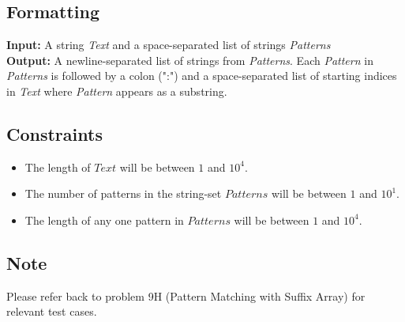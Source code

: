 \documentclass{article}
\begin{document}
\subsection*{Formatting}
\textbf{Input:} A string \emph{Text} and a space-separated list of strings \emph{Patterns}\\
\noindent\textbf{Output:} A newline-separated list of strings from \emph{Patterns}. Each \emph{Pattern} in \emph{Patterns} is followed by a colon (":") and a space-separated list of starting indices in \emph{Text} where \emph{Pattern} appears as a substring.

\subsection*{Constraints}
\begin{itemize}
    \item The length of $Text$ will be between $1$ and $10^4$.
    \item The number of patterns in the string-set $Patterns$ will be between $1$ and $10^1$.
    \item The length of any one pattern in $Patterns$ will be between $1$ and $10^4$.
\end{itemize}

\subsection*{Note}
Please refer back to problem 9H (Pattern Matching with Suffix Array) for relevant test cases.
\pagebreak
\end{document}
